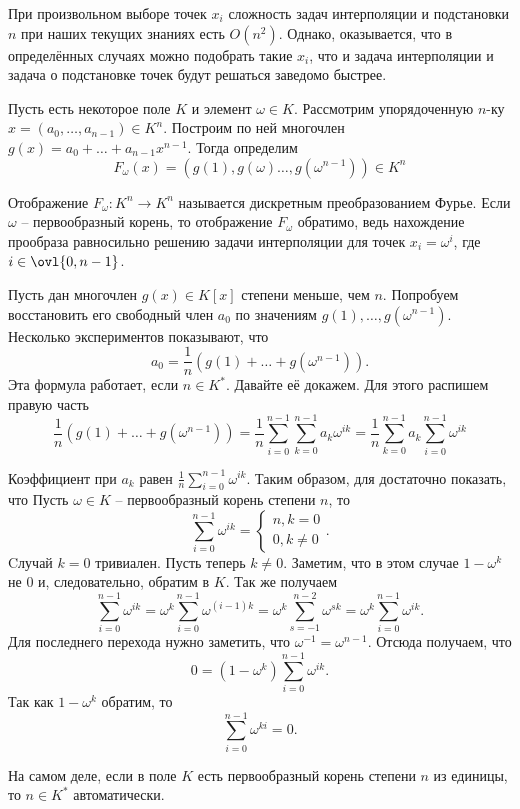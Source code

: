 При произвольном выборе точек $x_i$ сложность задач интерполяции и подстановки $n$ при наших текущих знаниях есть $O(n^2)$. Однако, оказывается, что в определённых случаях можно подобрать такие $x_i$, что и задача интерполяции и задача о подстановке точек будут решаться заведомо быстрее.

Пусть есть некоторое поле $K$ и элемент $\omega \in K$. Рассмотрим упорядоченную $n$-ку $x=(a_0,\dots,a_{n-1})\in K^n$. Построим по ней многочлен $g(x)=a_0+\dots+a_{n-1}x^{n-1}$. Тогда определим $$F_{\omega}(x)=(g(1), g(\omega)\dots,g(\omega^{n-1}))\in K^n$$


Отображение $F_{\omega}\colon K^n \to K^n$ называется дискретным преобразованием Фурье. Если $\omega$ -- первообразный корень, то отображение $F_{\omega}$ обратимо, ведь нахождение прообраза равносильно решению задачи интерполяции для точек $x_i=\omega^i$, где $i\in \ovl{0,n-1}$. 

Пусть дан многочлен $g(x) \in K[x]$ степени меньше, чем $n$. Попробуем восстановить его свободный член $a_0$ по значениям $g(1),\dots,g(\omega^{n-1})$. Несколько экспериментов показывают, что 
$$a_0=\frac{1}{n}\left(g(1)+\dots+g(\omega^{n-1})\right).$$
Эта формула работает, если $n \in K^*$. Давайте её докажем. Для этого распишем правую часть
$$\frac{1}{n}\left(g(1)+\dots+g(\omega^{n-1})\right)=\frac{1}{n}\sum_{i=0}^{n-1} \sum_{k=0}^{n-1} a_k \omega^{ik}=\frac{1}{n}\sum_{k=0}^{n-1} a_k\sum_{i=0}^{n-1} \omega^{ik}$$

Коэффициент при $a_k$ равен $\frac{1}{n} \sum_{i=0}^{n-1}\omega^{ik}$. Таким образом, для  достаточно показать, что
\lm Пусть $\omega \in K$ -- первообразный корень степени $n$, то $$\sum_{i=0}^{n-1}\omega^{ik}=\begin{cases} n, k=0\\
0, k\neq 0
\end{cases}.$$
\elm
\proof Cлучай $k=0$ тривиален. Пусть теперь $k\neq 0$. Заметим, что в этом случае $1-\omega^{k}$ не $0$ и, следовательно, обратим в $K$. Так же получаем
$$\sum_{i=0}^{n-1}\omega^{ik}=\omega^{k}\sum_{i=0}^{n-1} \omega^{(i-1)k}=\omega^{k}\sum_{s=-1}^{n-2} \omega^{sk}=\omega^{k}\sum_{i=0}^{n-1} \omega^{ik}.$$
Для последнего перехода нужно заметить, что $\omega^{-1}=\omega^{n-1}$. Отсюда получаем, что 
$$0=(1-\omega^k)\sum_{i=0}^{n-1} \omega^{ik}.$$
Так как $1-\omega^k$ обратим, то  $$\sum_{i=0}^{n-1}\omega^{ki}=0.$$
\endproof

\upr На самом деле, если в поле $K$ есть первообразный корень степени $n$ из единицы, то $n \in K^*$ автоматически.
\eupr


